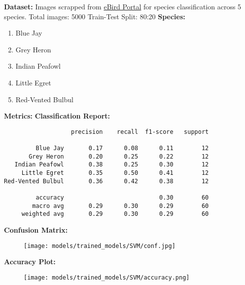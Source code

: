 \documentclass{article}
\begin{document}
\noindent \textbf{Dataset:}
Images scrapped from \href{https://ebird.org/explore}{eBird Portal}  for species classification across 5 species.
\newline
Total images: 5000
\newline
Train-Test Split: 80:20
\newline
\newline
\noindent \textbf{Species:}
\begin{enumerate}[noitemsep]
  \item Blue Jay
  \item Grey Heron
  \item Indian Peafowl
  \item Little Egret
  \item Red-Vented Bulbul
\end{enumerate}
\vspace{5mm}
\noindent \textbf{Metrics:}
\newline
\newline
\noindent \textbf{Classification Report:}

\begin{verbatim}                   precision    recall  f1-score   support

         Blue Jay       0.17      0.08      0.11        12
       Grey Heron       0.20      0.25      0.22        12
   Indian Peafowl       0.38      0.25      0.30        12
     Little Egret       0.35      0.50      0.41        12
Red-Vented Bulbul       0.36      0.42      0.38        12

         accuracy                           0.30        60
        macro avg       0.29      0.30      0.29        60
     weighted avg       0.29      0.30      0.29        60
\end{verbatim}
\newpage
\noindent \textbf{Confusion Matrix:}

\begin{figure}[h!]
\centering
\texttt{[image: models/trained\_models/SVM/conf.jpg]}
\end{figure}
\noindent \textbf{Accuracy Plot:}
\begin{figure}[h!]
\centering
\texttt{[image: models/trained\_models/SVM/accuracy.png]}
\end{figure}
\end{document}
